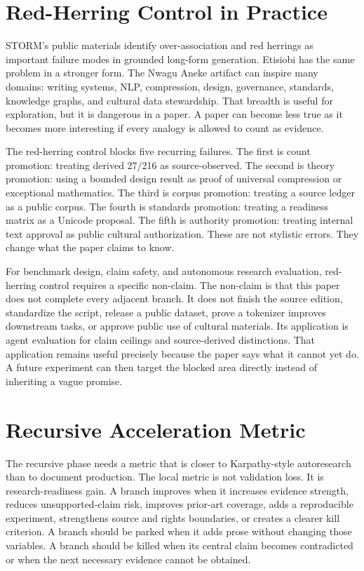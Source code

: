 \documentclass[sigconf,nonacm]{acmart}
\begin{document}
\section{Red-Herring Control in Practice}
STORM's public materials identify over-association and red herrings as important
failure modes in grounded long-form generation. Etisiobi has the same problem in
a stronger form. The Nwagu Aneke artifact can inspire many domains: writing
systems, NLP, compression, design, governance, standards, knowledge graphs, and
cultural data stewardship. That breadth is useful for exploration, but it is
dangerous in a paper. A paper can become less true as it becomes more
interesting if every analogy is allowed to count as evidence.

The red-herring control blocks five recurring failures. The first is count
promotion: treating derived 27/216 as source-observed. The second is theory
promotion: using a bounded design result as proof of universal compression or
exceptional mathematics. The third is corpus promotion: treating a source
ledger as a public corpus. The fourth is standards promotion: treating a
readiness matrix as a Unicode proposal. The fifth is authority promotion:
treating internal text approval as public cultural authorization. These are not
stylistic errors. They change what the paper claims to know.

For benchmark design, claim safety, and autonomous research evaluation, red-herring control requires a specific non-claim. The non-claim is
that this paper does not complete every adjacent branch. It does not finish the
source edition, standardize the script, release a public dataset, prove a
tokenizer improves downstream tasks, or approve public use of cultural
materials. Its application is agent evaluation for claim ceilings and source-derived distinctions. That application remains useful
precisely because the paper says what it cannot yet do. A future experiment can
then target the blocked area directly instead of inheriting a vague promise.

\section{Recursive Acceleration Metric}
The recursive phase needs a metric that is closer to Karpathy-style autoresearch
than to document production. The local metric is not validation loss. It is
research-readiness gain. A branch improves when it increases evidence strength,
reduces unsupported-claim risk, improves prior-art coverage, adds a reproducible
experiment, strengthens source and rights boundaries, or creates a clearer kill
criterion. A branch should be parked when it adds prose without changing those
variables. A branch should be killed when its central claim becomes contradicted
or when the next necessary evidence cannot be obtained.
\end{document}
